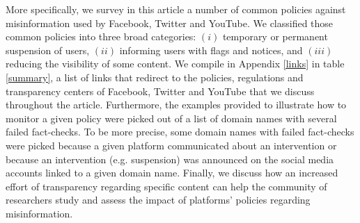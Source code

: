 \documentclass{article}
\begin{document}
\smallskip

More specifically, we survey in this article a number of common policies against misinformation used by Facebook, Twitter and YouTube. We classified those common policies into three broad categories: $(i)$ temporary or permanent suspension of users, $(ii)$ 
informing users with flags and notices, and $(iii)$ reducing the visibility of some content. We compile in Appendix \ref{links} in table \ref{summary}, a list of links that redirect to the policies, regulations and transparency centers of Facebook, Twitter and YouTube that we discuss throughout the article. Furthermore, the examples provided to illustrate how to monitor a given policy were picked out of a list of domain names with several failed fact-checks. To be more precise, some domain names with failed fact-checks were picked because a given platform communicated about an intervention or because an intervention (e.g. suspension) was announced on the social media accounts linked to a given domain name. Finally, we discuss how an increased effort of transparency regarding specific content can help the community of researchers study and assess the impact of platforms' policies regarding misinformation. 

\smallskip 




\end{document}
